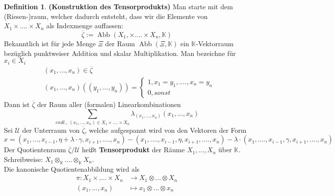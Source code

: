 \documentclass[12pt,a4paper]{article}
\theoremstyle{definition}
\newtheorem{definition}[theorem]{Definition}
\theoremstyle{remark}
\renewcommand{\bar}[1]{\overline{#1}}
\DeclareMathOperator{\Abb}{Abb}
\begin{document}
	\begin{definition}{\textbf{(Konstruktion des Tensorprodukts)}}
		Man starte mit dem (Riesen-)raum, welcher dadurch entsteht, dass wir die Elemente von $X_1 \times .... \times X_n$ als Indexmenge auffassen:
		\begin{equation}
			\bar{\zeta}:= \Abb (X_1, \times .... \times X_n, \mathbb{K})
		\end{equation}
		Bekanntlich ist für jede Menge $\Xi$ der Raum $\Abb (\Xi, \mathbb{K})$ ein $\mathbb{K}$-Vektorraum bezüglich punktweiser Addition und skalar Multiplikation. Man bezeichne für $x_i \in X_i$
		\begin{equation}
			\begin{split}
				&(x_1,...,x_n) \in \bar{\zeta}  \\
				&(x_1,...,x_n) \left( (y_1,...,y_n) \right)= \begin{cases}
						1, x_1 = y_1,....,x_n= y_n \\
						0, sonst
					\end{cases}
			\end{split}
		\end{equation}
		Dann ist $\bar{\zeta}$ der Raum aller (formalen) Linearkombinationen
		\begin{equation}
			\sum_{endl., \ 
			(x_1,...,x_n) \in X_1 \times .... \times X_n} \lambda_{(x_1,...,x_n)} (x_1,...,x_n)
		\end{equation}
		Sei $\mathcal{U}$ der Unterraum von $\bar{\zeta}$, welche aufgespannt wird von den Vektoren der Form
		\begin{equation}
			x = (x_1,...,x_{i-1}, \eta + \lambda \cdot \gamma, x_{i+1},....,x_n)-(x_1,....,x_{i-1},\eta,x_{i+1},....,x_n) - \lambda \cdot (x_1,....,x_{i-1}, \gamma,x_{i+1},....,x_n)
		\end{equation}
		Der Quotientenraum $\bar{\zeta}/\mathcal{U}$ heißt \textbf{Tensorprodukt} der Räume $X_1,...,X_n$ über $\mathbb{K}$. \\
		Schreibweise: $X_1 \otimes_{\mathbb{K}} .... \otimes_{\mathbb{K}} X_n $. \\
		Die kanonische Quotientenabbildung wird als
		\begin{equation}
			\begin{split}
				\pi : X_1 \times .... \times X_n &\rightarrow X_1 \otimes ... \otimes X_n \\
				(x_1,...,x_n) &\mapsto x_1 \otimes ... \otimes x_n
			\end{split}
		\end{equation}
	\end{definition}
\end{document}

